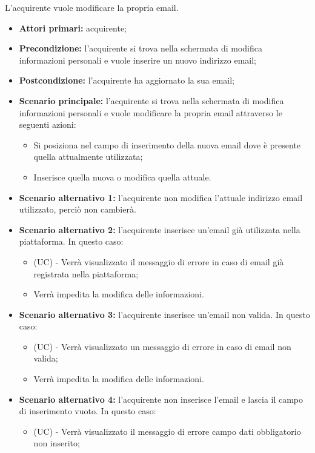L'acquirente vuole modificare la propria email.
\begin{itemize}
    \item \textbf{Attori primari:} acquirente;
    \item \textbf{Precondizione:} l'acquirente si trova nella schermata di modifica informazioni personali e vuole inserire un nuovo indirizzo email;
    \item \textbf{Postcondizione:} l'acquirente ha aggiornato la sua email;
    \item \textbf{Scenario principale:} l'acquirente si trova nella schermata di modifica informazioni personali e vuole modificare la propria email attraverso le seguenti azioni:
        \begin{itemize}
            \item Si posiziona nel campo di inserimento della nuova email dove è presente quella attualmente utilizzata;
            \item Inserisce quella nuova o modifica quella attuale.
        \end{itemize}
    \item \textbf{Scenario alternativo 1:} l'acquirente non modifica l'attuale indirizzo email utilizzato, perciò non cambierà.
    \item \textbf{Scenario alternativo 2:} l'acquirente inserisce un'email già utilizzata nella piattaforma. In questo caso:
    \begin{itemize}
        \item (UC) - Verrà visualizzato il messaggio di errore in caso di email già registrata nella piattaforma;
        \item Verrà impedita la modifica delle informazioni.
    \end{itemize}
    \item \textbf{Scenario alternativo 3:} l'acquirente inserisce un'email non valida. In questo caso:
    \begin{itemize}
        \item (UC) - Verrà visualizzato un messaggio di errore in caso di email non valida;
        \item Verrà impedita la modifica delle informazioni.
    \end{itemize}
    \item \textbf{Scenario alternativo 4:} l'acquirente non inserisce l'email e lascia il campo di inserimento vuoto. In questo caso:
    \begin{itemize}
        \item (UC) - Verrà visualizzato il messaggio di errore campo dati obbligatorio non inserito;

\end{itemize}
\end{itemize}
